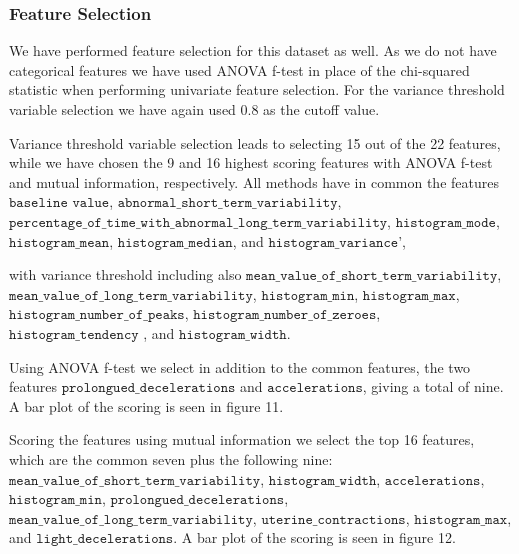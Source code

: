 \documentclass[11pt]{article}
\begin{document}
    \hypertarget{feature-selection2}{%
	\subsubsection{Feature Selection}\label{feature-selection2}}
 We have performed feature selection for this dataset as well. As we do not have categorical features we have used ANOVA f-test in place of the chi-squared statistic when performing univariate feature selection. For the variance threshold variable selection we have again used 0.8 as the cutoff value.
 
Variance threshold variable selection leads to selecting 15 out of the 22 features, while we have chosen the 9 and 16 highest scoring features with ANOVA f-test and mutual information, respectively. All methods have in common the features $\texttt{baseline value}$, $\texttt{abnormal\_short\_term\_variability}$, $\texttt{percentage\_of\_time\_with\_abnormal\_long\_term\_variability}$, $\texttt{histogram\_mode}$, $\texttt{histogram\_mean}$, $\texttt{histogram\_median}$, and $\texttt{histogram\_variance}$',

 with variance threshold including also $\texttt{mean\_value\_of\_short\_term\_variability}$, $\texttt{mean\_value\_of\_long\_term\_variability}$, $\texttt{histogram\_min}$,  $\texttt{histogram\_max}$, $\texttt{histogram\_number\_of\_peaks}$, $\texttt{histogram\_number\_of\_zeroes}$, $\texttt{histogram\_tendency}$ , and $\texttt{histogram\_width}$.
 
 
 Using ANOVA f-test we select in addition to the common features, the two features $\texttt{prolongued\_decelerations}$ and $\texttt{accelerations}$, giving a total of nine. A bar plot of the scoring is seen in figure 11.
 
 Scoring the features using mutual information we select the top 16 features, which are the common seven plus the following nine: $\texttt{mean\_value\_of\_short\_term\_variability}$, $\texttt{histogram\_width}$, $\texttt{accelerations}$, $\texttt{histogram\_min}$, $\texttt{prolongued\_decelerations}$, $\texttt{mean\_value\_of\_long\_term\_variability}$, $\texttt{uterine\_contractions}$, $\texttt{histogram\_max}$, and $\texttt{light\_decelerations}$. A bar plot of the scoring is seen in figure 12.
 
 
 \begin{center}
 \end{center}
 { \hspace*{\fill} \\}
 
\end{document}
